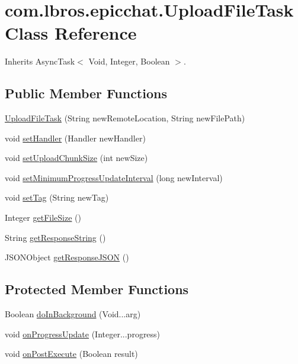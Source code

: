 \hypertarget{classcom_1_1lbros_1_1epicchat_1_1_upload_file_task}{\section{com.\-lbros.\-epicchat.\-Upload\-File\-Task Class Reference}
\label{classcom_1_1lbros_1_1epicchat_1_1_upload_file_task}
}


Inherits Async\-Task$<$ Void, Integer, Boolean $>$.

\subsection*{Public Member Functions}
\begin{DoxyCompactItemize}
\item 
\hyperlink{classcom_1_1lbros_1_1epicchat_1_1_upload_file_task_a8aa91adfce184b374ea05253fb615c1f}{Upload\-File\-Task} (String new\-Remote\-Location, String new\-File\-Path)
\item 
void \hyperlink{classcom_1_1lbros_1_1epicchat_1_1_upload_file_task_a6da2005ca957b72e9c9fbcd18d4d42d1}{set\-Handler} (Handler new\-Handler)
\item 
void \hyperlink{classcom_1_1lbros_1_1epicchat_1_1_upload_file_task_afa592ffdc5c8b191563d0b19e9fe2988}{set\-Upload\-Chunk\-Size} (int new\-Size)
\item 
void \hyperlink{classcom_1_1lbros_1_1epicchat_1_1_upload_file_task_a23763c92b12a03547bda7499ebfb6195}{set\-Minimum\-Progress\-Update\-Interval} (long new\-Interval)
\item 
void \hyperlink{classcom_1_1lbros_1_1epicchat_1_1_upload_file_task_ac98b0de5af01afc8e10733e0db1d5033}{set\-Tag} (String new\-Tag)
\item 
Integer \hyperlink{classcom_1_1lbros_1_1epicchat_1_1_upload_file_task_aeedb38bf803104fad2f2ba9db9045715}{get\-File\-Size} ()
\item 
String \hyperlink{classcom_1_1lbros_1_1epicchat_1_1_upload_file_task_acda14be8c9c0294c6679f7d200df6ad4}{get\-Response\-String} ()
\item 
J\-S\-O\-N\-Object \hyperlink{classcom_1_1lbros_1_1epicchat_1_1_upload_file_task_a9bc427b122335137fcb5ecc5c932d062}{get\-Response\-J\-S\-O\-N} ()
\end{DoxyCompactItemize}
\subsection*{Protected Member Functions}
\begin{DoxyCompactItemize}
\item 
Boolean \hyperlink{classcom_1_1lbros_1_1epicchat_1_1_upload_file_task_a0a50e55c7c83d819c1594ba7df43e152}{do\-In\-Background} (Void...\-arg)
\item 
void \hyperlink{classcom_1_1lbros_1_1epicchat_1_1_upload_file_task_acc4ea336394f139d87f18f0fe04fc68b}{on\-Progress\-Update} (Integer...\-progress)
\item 
void \hyperlink{classcom_1_1lbros_1_1epicchat_1_1_upload_file_task_a93ec70bdb277c3dba7ea7e0f8a3ee1b2}{on\-Post\-Execute} (Boolean result)
\end{DoxyCompactItemize}


